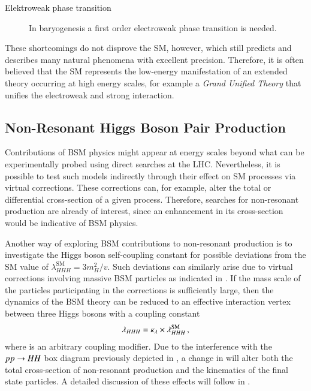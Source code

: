 \begin{description}
\item[Elektroweak phase transition] In baryogenesis a first order
  electroweak phase transition is needed.

\end{description}
These shortcomings do not disprove the SM, however, which still predicts and
describes many natural phenomena with excellent precision. Therefore, it is
often believed that the SM represents the low-energy manifestation of an
extended theory occurring at high energy scales, for example a \emph{Grand
  Unified Theory} that unifies the electroweak and strong interaction.


\subsection{Non-Resonant Higgs Boson Pair Production}%
\label{sec:bsm_nonresonant_hh}

Contributions of BSM physics might appear at energy scales beyond what can be
experimentally probed using direct searches at the LHC. Nevertheless, it is
possible to test such models indirectly through their effect on SM processes via
virtual corrections. These corrections can, for example, alter the total or
differential cross-section of a given process. Therefore, searches for
non-resonant \HH production are already of interest, since an enhancement in its
cross-section would be indicative of BSM physics.

Another way of exploring BSM contributions to non-resonant \HH production is to
investigate the Higgs boson self-coupling constant for possible deviations from
the SM value of $\lambda_{HHH}^\text{SM} = 3 m_{H}^2 / v$. Such deviations can
similarly arise due to virtual corrections involving massive BSM particles as
indicated in . If the mass scale of the particles
participating in the corrections is sufficiently large, then the dynamics of the
BSM theory can be reduced to an effective interaction vertex between three Higgs
bosons with a coupling constant
\begin{align*}
  \lambda_{HHH} = \kappa_{\lambda} \times \lambda_{HHH}^{\text{SM}} \,\text{,}
\end{align*}
where \klambda is an arbitrary coupling modifier. Due to the interference with
the $pp \to HH$ box diagram previously depicted in
, a change in \klambda will alter both the total
cross-section of non-resonant \HH production and the kinematics of the final
state particles. A detailed discussion of these effects will follow in
.

